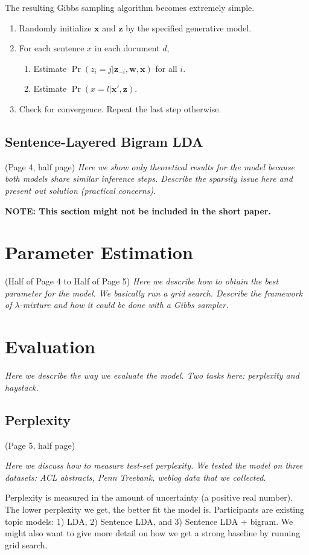 The resulting Gibbs sampling algorithm becomes extremely simple.

\begin{enumerate}
  \item Randomly initialize $\mathbf{x}$ and $\mathbf{z}$ by the specified generative model.
  \item For each sentence $x$ in each document $d$, \begin{enumerate}
    \item Estimate $\Pr(z_i = j|\mathbf{z}_{-i}, \mathbf{w}, \mathbf{x})$ for all $i$.
    \item Estimate $\Pr(x = l|\mathbf{x}',\mathbf{z})$.
  \end{enumerate}
  \item Check for convergence.  Repeat the last step otherwise.
\end{enumerate}

\subsection{Sentence-Layered Bigram LDA} (Page 4, half page) { \it Here we show only
theoretical results for the model because both models share similar inference
steps.  Describe the sparsity issue here and present out solution (practical
concerns). }

{ \bf NOTE: This section might not be included in the short paper. }

\section{Parameter Estimation} (Half of Page 4 to Half of Page 5) { \it Here we
describe how to obtain the best parameter for the model.  We basically run a
grid search.  Describe the framework of $\lambda$-mixture and how it could be
done with a Gibbs sampler. }

\section{Evaluation}
{ \it Here we describe the way we evaluate the model.  Two tasks here: perplexity and haystack. }

\subsection{Perplexity}
(Page 5, half page) { \it Here we discuss how to measure test-set perplexity.  We tested the model on
three datasets: ACL abstracts, Penn Treebank, weblog data that we collected.

Perplexity is measured in the amount of uncertainty (a positive real number).
The lower perplexity we get, the better fit the model is.  Participants are
existing topic models: 1) LDA, 2) Sentence LDA, and 3) Sentence LDA + bigram.
We might also want to give more detail on how we get a strong baseline by
running grid search. }

